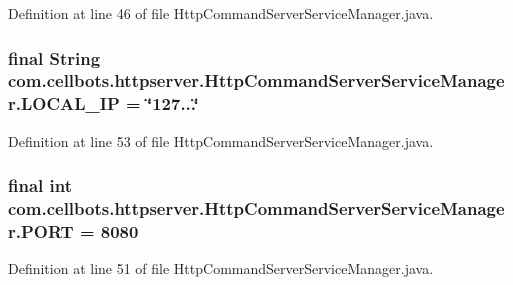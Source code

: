 Definition at line 46 of file Http\-Command\-Server\-Service\-Manager.\-java.

\hypertarget{classcom_1_1cellbots_1_1httpserver_1_1_http_command_server_service_manager_a99a75b81829498e33b59d6be766acdbb}{
\subsubsection[{L\-O\-C\-A\-L\-\_\-\-I\-P}]{\setlength{\rightskip}{0pt plus 5cm}final String {\bf com.\-cellbots.\-httpserver.\-Http\-Command\-Server\-Service\-Manager.\-L\-O\-C\-A\-L\-\_\-\-I\-P} = \char`\"{}127...\char`\"{}}}\label{classcom_1_1cellbots_1_1httpserver_1_1_http_command_server_service_manager_a99a75b81829498e33b59d6be766acdbb}


Definition at line 53 of file Http\-Command\-Server\-Service\-Manager.\-java.

\hypertarget{classcom_1_1cellbots_1_1httpserver_1_1_http_command_server_service_manager_a8c9c780120e49febbb7090e4e967a23a}{
\subsubsection[{P\-O\-R\-T}]{\setlength{\rightskip}{0pt plus 5cm}final int {\bf com.\-cellbots.\-httpserver.\-Http\-Command\-Server\-Service\-Manager.\-P\-O\-R\-T} = 8080}}\label{classcom_1_1cellbots_1_1httpserver_1_1_http_command_server_service_manager_a8c9c780120e49febbb7090e4e967a23a}


Definition at line 51 of file Http\-Command\-Server\-Service\-Manager.\-java.

